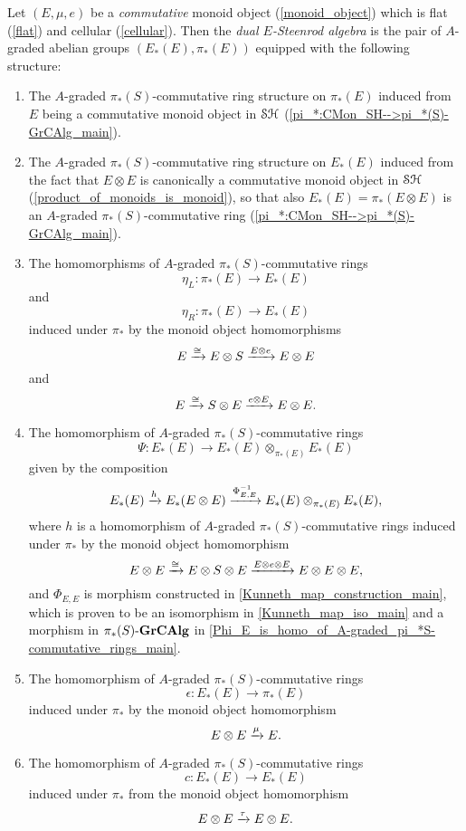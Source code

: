\documentclass[../main.tex]{subfiles}
\begin{document}
\begin{definition}\label{dual_E-Steenrod_algebra_defn}
    Let $(E,\mu,e)$ be a \emph{commutative} monoid object (\autoref{monoid_object}) which is flat (\autoref{flat}) and cellular (\autoref{cellular}). Then the \emph{dual $E$-Steenrod algebra} is the pair of $A$-graded abelian groups $(E_*(E),\pi_*(E))$ equipped with the following structure:\begin{enumerate}[label={\arabic*.}]
        \item The $A$-graded $\pi_*(S)$-commutative ring structure on $\pi_*(E)$
        induced from $E$ being a commutative monoid object in $\mathcal{SH}$ (\autoref{pi_*:CMon_SH-->pi_*(S)-GrCAlg_main}).
        \item The $A$-graded $\pi_*(S)$-commutative ring structure on $E_*(E)$ induced from the fact that $E\otimes E$ is canonically a commutative monoid object in $\mathcal{SH}$ (\autoref{product_of_monoids_is_monoid}), so that also $E_*(E)=\pi_*(E\otimes E)$ is an $A$-graded $\pi_*(S)$-commutative ring (\autoref{pi_*:CMon_SH-->pi_*(S)-GrCAlg_main}).
        \item The homomorphisms of $A$-graded $\pi_*(S)$-commutative rings
        \[\eta_L:\pi_*(E)\to E_*(E)\]
        and
        \[\eta_R:\pi_*(E)\to E_*(E)\]
        induced under $\pi_*$ by the monoid object homomorphisms
        \[E\xrightarrow\cong E\otimes S\xrightarrow{E\otimes e}E\otimes E\]
        and
        \[E\xrightarrow\cong S\otimes E\xrightarrow{e\otimes E}E\otimes E.\]
        \item The homomorphism of $A$-graded $\pi_*(S)$-commutative rings
        \[\Psi:E_*(E)\to E_*(E)\otimes_{\pi_*(E)}E_*(E)\]
        given by the composition
        \[E_*(E)\xrightarrow{h}E_*(E\otimes E)\xrightarrow{\Phi_{E,E}^{-1}}E_*(E)\otimes_{\pi_*(E)}E_*(E),\]
        where $h$ is a homomorphism of $A$-graded $\pi_*(S)$-commutative rings induced under $\pi_*$ by the monoid object homomorphism
        \[E\otimes E\xrightarrow\cong E\otimes S\otimes E\xrightarrow{E\otimes e\otimes E}E\otimes E\otimes E,\]
        and $\Phi_{E,E}$ is morphism constructed in \autoref{Kunneth_map_construction_main}, which is proven to be an isomorphism in \autoref{Kunneth_map_iso_main} and a morphism in ${\pi_*(S)}\text-\mathbf{GrCAlg}$ in \autoref{Phi_E_is_homo_of_A-graded_pi_*S-commutative_rings_main}.
        \item The homomorphism of $A$-graded $\pi_*(S)$-commutative rings
        \[\epsilon:E_*(E)\to\pi_*(E)\]
        induced under $\pi_*$ by the monoid object homomorphism
        \[E\otimes E\xrightarrow\mu E.\]
        \item The homomorphism of $A$-graded $\pi_*(S)$-commutative rings
        \[c:E_*(E)\to E_*(E)\]
        induced under $\pi_*$ from the monoid object homomorphism
        \[E\otimes E\xrightarrow\tau E\otimes E.\]
    \end{enumerate}
\end{definition}
\end{document}
